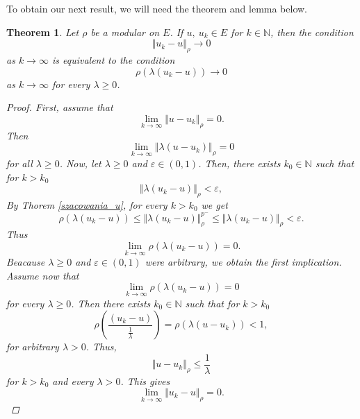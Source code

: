 \documentclass[12pt,a4paper,oneside,titlepage]{article}
\newtheorem{Twierdzenie}{Theorem}
\renewcommand{\epsilon}{\varepsilon}
\begin{document}
\smallskip

To obtain our next result, we will need the theorem and lemma below.

\begin{Twierdzenie}
\label{rownowaznosc_1}
Let $\rho$ be a modular on $E $. If $u, ~u_k \in E$ for $k \in \mathbb{N}$, then the condition 
\begin{equation}
\nonumber
\Vert u_k - u \Vert_{\rho} \rightarrow 0
\end{equation}
 as $k \rightarrow \infty$ is equivalent to the condition  
\begin{equation}
\nonumber
\rho (\lambda (u_k - u)) \rightarrow 0
\end{equation} 
as $k \rightarrow \infty $ for every $\lambda \geq 0$.
\begin{proof}
First, assume that
\begin{equation}
\nonumber
\lim_{k \rightarrow \infty} \Vert u - u_k \Vert_{\rho} = 0.
\end{equation}
Then
\begin{equation}
\nonumber
\lim_{k \rightarrow \infty} \Vert \lambda ( u - u_k) \Vert_{\rho} = 0 
\end{equation}
for all $\lambda \geq 0$. Now, let $\lambda \geq 0$ and $\epsilon \in (0,1)$. Then, there exists $k_0 \in \mathbb{N}$ such that for $k>k_0$
\begin{equation}
\nonumber
\Vert \lambda \left(u_k -u \right) \Vert_{\rho} < \epsilon,
\end{equation}
By Thorem \ref{szacowania_u}, for  every $k>k_0$ we get
\begin{equation}
\nonumber
\rho \left( \lambda  \left( u_k - u  \right) \right) \leq \Vert \lambda (u_k - u ) \Vert_{\rho}^{p^-} \leq \Vert \lambda (u_k - u ) \Vert_{\rho}  < \epsilon.
\end{equation}
Thus 
\begin{equation}
\nonumber
\lim_{k \rightarrow \infty } \rho \left( \lambda  \left( u_k - u  \right) \right) = 0.
\end{equation}
Beacause $\lambda \geq 0$ and $\epsilon \in (0,1)$ were arbitrary, we obtain the first implication. \\
\indent
Assume now that
\begin{equation}
\nonumber
\lim_{k \rightarrow \infty} \rho(\lambda \left( u_k - u \right) ) = 0 
\end{equation}
for every $\lambda \geq 0$. Then there exists $k_0 \in \mathbb{N}$ such that for $k>k_0$
\begin{equation}
\nonumber 
 \rho \left( \frac{  \left( u_k - u  \right)}{\frac{1}{\lambda}} \right)  =\rho(\lambda \left( u - u_k \right) ) < 1,
\end{equation}
for arbitrary $\lambda > 0$. Thus,
\begin{equation}
\nonumber
\Vert u - u_k \Vert_{\rho} \leq \frac{1}{\lambda}
\end{equation}
for $k>k_0$ and every $\lambda >0$.
This gives
\begin{equation}
\nonumber
\lim_{k \rightarrow \infty} \Vert u_k - u \Vert_{\rho} = 0.
\end{equation}
\end{proof}




\end{Twierdzenie}
\end{document}
